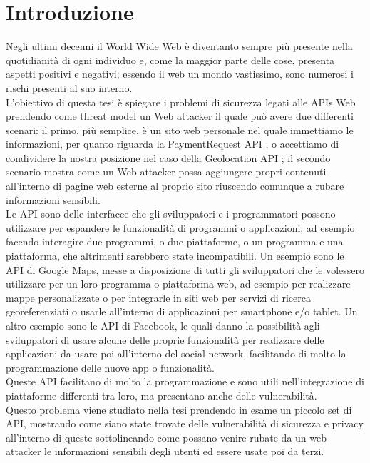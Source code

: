 \documentclass[11pt ,a4paper , twoside , openright ]{article}
\begin{document}
\section{Introduzione}
Negli ultimi decenni il World Wide Web è diventanto sempre più presente nella quotidianità di ogni individuo e, come la maggior parte delle cose, presenta aspetti positivi e negativi;
essendo il web un mondo vastissimo, sono numerosi i rischi presenti al suo interno.
\\
L'obiettivo di questa tesi è spiegare i problemi di sicurezza legati alle APIs Web prendendo come threat model un Web attacker il quale può avere due differenti scenari: il primo, più semplice, è un sito web personale nel quale immettiamo le informazioni, per quanto riguarda la PaymentRequest API \cite{rif1}, o accettiamo di condividere la nostra posizione nel caso della Geolocation API \cite{rif2}; il secondo scenario mostra come un Web attacker possa aggiungere propri contenuti all'interno di pagine web esterne al proprio sito riuscendo comunque a rubare informazioni sensibili.
\\
Le API sono delle interfacce che gli sviluppatori e i programmatori possono utilizzare per espandere le funzionalità di programmi o applicazioni, ad esempio facendo interagire due programmi, o due piattaforme, o un programma e una piattaforma, che altrimenti sarebbero state incompatibili.
Un esempio sono le API di Google Maps, messe a disposizione di tutti gli sviluppatori che le volessero utilizzare per un loro programma o piattaforma web, ad esempio per realizzare mappe personalizzate o per integrarle in siti web per servizi di ricerca georeferenziati o usarle all'interno di applicazioni per smartphone e/o tablet.
Un altro esempio sono le API di Facebook, le quali danno la possibilità agli sviluppatori di usare alcune delle proprie funzionalità per realizzare delle applicazioni da usare poi all'interno del social network, facilitando di molto la programmazione delle nuove app o funzionalità.
\\
Queste API facilitano di molto la programmazione e sono utili nell'integrazione di piattaforme differenti tra loro, ma presentano anche delle vulnerabilità.
\\
Questo problema viene studiato nella tesi prendendo in esame un piccolo set di API, mostrando come siano state trovate delle vulnerabilità di sicurezza e privacy all'interno di queste sottolineando come possano venire rubate da un web attacker le informazioni sensibili degli utenti ed essere usate poi da terzi.
\\
\end{document}
